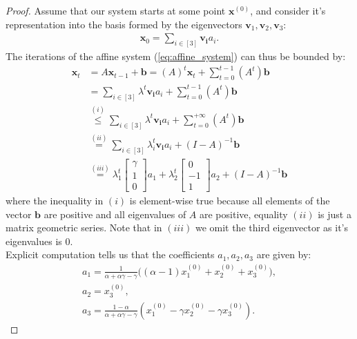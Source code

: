 \begin{proof}
    Assume that our system starts at some point $\bm{x}^{(0)}$, and consider it's representation into the basis formed by the eigenvectors $\bm{v}_1,\bm{v}_2,\bm{v}_3$:
    \begin{align*}
        \bm{x}_0 = \sum_{i\in [3]} \bm{v_i}a_i.
    \end{align*}
    The iterations of the affine system (\ref{eq:affine_system}) can thus be bounded by:
    \begin{align*}
        \bm{x}_{t} 
        &= A\bm{x}_{t-1} + \bm{b} = (A)^t \bm{x}_t + \sum_{t=0}^{t-1}(A^t)\bm{b}\\
        &= \sum_{i\in [3]} \lambda^t \bm{v_i} a_i + \sum_{t=0}^{t-1}(A^t)\bm{b}\\
        &\stackrel{(i)}{\leq} \sum_{i\in [3]} \lambda^t \bm{v_i} a_i + \sum_{t=0}^{+\infty}(A^t)\bm{b}\\
        &\stackrel{(ii)}{=} \sum_{i\in [3]} \lambda_i^t \bm{v_i} a_i + (I-A)^{-1}\bm{b}\\
        &\stackrel{(iii)}{=} \lambda_1^t \begin{bmatrix}
            \gamma \\ 1 \\ 0
        \end{bmatrix} a_1
         + \lambda_2^t   \begin{bmatrix}
            0 \\ -1 \\ 1
        \end{bmatrix} a_2 +  (I-A)^{-1}\bm{b}
    \end{align*}
    where the inequality in $(i)$ is element-wise true because all elements of the vector $\bm{b}$ are positive and all eigenvalues of $A$ are positive, equality $(ii)$ is just a matrix geometric series. Note that in $(iii)$ we omit the third eigenvector as it's eigenvalues is $0$. \\

    Explicit computation tells us that the coefficients $a_1,a_2,a_3$ are given by:
    \begin{align*}
        a_1 = \frac{1}{\alpha + \alpha\gamma - \gamma} \Big( (\alpha - 1)x_1^{(0)}+x_2^{(0)}+x_3^{(0)} \Big),\\
        a_2 = x_3^{(0)},\\
        a_3 = \frac{1 - \alpha}{\alpha + \alpha\gamma - \gamma} (x_1^{(0)} - \gamma x_2^{(0)} - \gamma x_3^{(0)}).
    \end{align*}


\end{proof}
